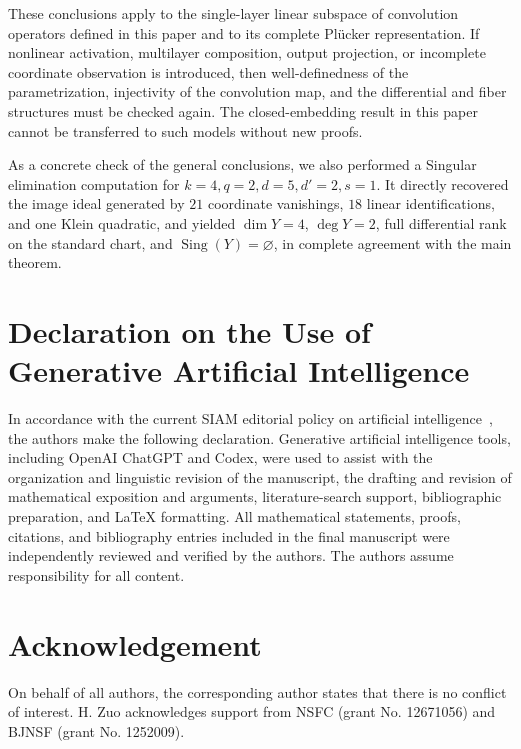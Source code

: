 \documentclass{siamonline250211}
\newcommand{\Sing}{\operatorname{Sing}}
\begin{document}
These conclusions apply to the single-layer linear subspace of convolution
operators defined in this paper and to its complete Pl\"ucker representation.
If nonlinear activation, multilayer composition, output projection, or
incomplete coordinate observation is introduced, then well-definedness of the
parametrization, injectivity of the convolution map, and the differential and
fiber structures must be checked again. The closed-embedding result in this
paper cannot be transferred to such models without new proofs.

As a concrete check of the general conclusions, we also performed a Singular
elimination computation for $k=4,q=2,d=5,d'=2,s=1$. It directly recovered the
image ideal generated by $21$ coordinate vanishings, $18$ linear
identifications, and one Klein quadratic, and yielded $\dim Y=4$,
$\deg Y=2$, full differential rank on the standard chart, and
$\Sing(Y)=\varnothing$, in complete agreement with the main theorem.

\section*{Declaration on the Use of Generative Artificial Intelligence}

In accordance with the current SIAM editorial policy on artificial
intelligence~\cite{SIAMAI26}, the authors make the following declaration.
Generative artificial intelligence tools, including OpenAI ChatGPT and Codex,
were used to assist with the organization and linguistic revision of the
manuscript, the drafting and revision of mathematical exposition and arguments,
literature-search support, bibliographic preparation, and \LaTeX{} formatting.
All mathematical statements, proofs, citations, and bibliography entries
included in the final manuscript were independently reviewed and verified by the
authors. The authors assume responsibility for all content.

\section{Acknowledgement}
	
	On behalf of all authors, the corresponding author states that there is no conflict of interest.
H. Zuo acknowledges support from NSFC (grant No. 12671056) and BJNSF (grant No. 1252009).
\end{document}
